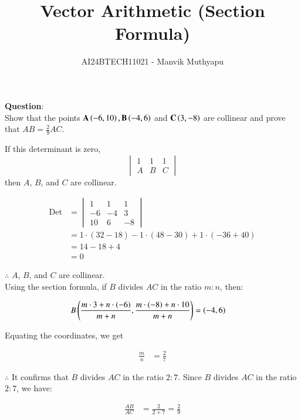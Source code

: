 \documentclass[journal,12pt,onecolumn]{IEEEtran}
\title{Vector Arithmetic (Section Formula)}
\author{AI24BTECH11021 - Manvik Muthyapu}
\theoremstyle{remark}
\begin{document}


\maketitle
\bigskip

\renewcommand{\thefigure}{\theenumi}
\renewcommand{\thetable}{\theenumi}


\textbf{Question}:\\

Show that the points $\textbf{A}\left(-6,10\right),\textbf{B}\left(-4,6\right)$ and $\textbf{C}\left(3,-8\right)$ are collinear and prove that $AB = \frac{2}{9}AC$.\\
		
\solution 

If this determinant is zero, 
\[
\begin{vmatrix}
1 & 1 & 1 \\
A & B & C
\end{vmatrix}
\]
then $A$, $B$, and $C$ are collinear.

\begin{align}
\text{Det} &=
\begin{vmatrix}
1 & 1 & 1 \\
-6 & -4 & 3 \\
10 & 6 & -8
\end{vmatrix} \\
&= 1 \cdot (32 - 18) - 1 \cdot (48 - 30) + 1 \cdot (-36 + 40) \\
&= 14 - 18 + 4 \\
&= 0
\end{align}

$\therefore$ $A$, $B$, and $C$ are collinear.\\

Using the section formula, if $B$ divides $AC$ in the ratio $m:n$, then:

\begin{align}
B\left(\frac{m \cdot 3 + n \cdot (-6)}{m+n}, \frac{m \cdot (-8) + n \cdot 10}{m+n}\right) &= (-4, 6)
\end{align}

Equating the coordinates, we get

\begin{align}
\frac{m}{n} &= \frac{2}{7}
\end{align}

$\therefore$ It confirms that $B$ divides $AC$ in the ratio $2:7$. Since $B$ divides $AC$ in the ratio $2:7$, we have:

\begin{align}
\frac{AB}{AC} &= \frac{2}{2+7} = \frac{2}{9}
\end{align}
\end{document}
